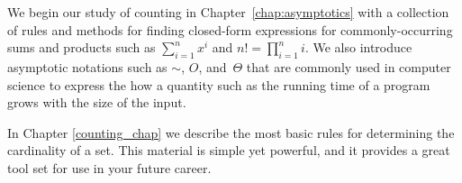 We begin our study of counting in Chapter~\ref{chap:asymptotics} with
a collection of rules and methods for finding closed-form expressions
for commonly-occurring sums and products such as $\sum_{i = 1}^n x^i$
and $n! = \prod_{i=1}^n i$.  We also introduce asymptotic notations
such as $\sim$, $O$, and~$\Theta$ that are commonly used in computer
science to express the how a quantity such as the running time of a
program grows with the size of the input.

\iffalse
In Chapter~\ref{chap:recurrences}, we show how to solve a variety of
recurrences that arise in computational problems.  These methods are
especially useful when you need to design or analyze recursive
programs.
\fi
In Chapter \ref{counting_chap}\iffalse
and~\ref{generating_function_chap}\fi
we describe the most basic rules for determining the cardinality of a
set.  This material is simple yet powerful, and it provides a great
tool set for use in your future career.

\iffalse
We conclude in Chapter~\ref{cardinality_chap} with a brief digression
into the final frontier of counting---infinity.  We'll define what it
means for a set to be countable and show you some examples of sets
that are really big---bigger even than the set of real numbers.
\fi

\endinput
